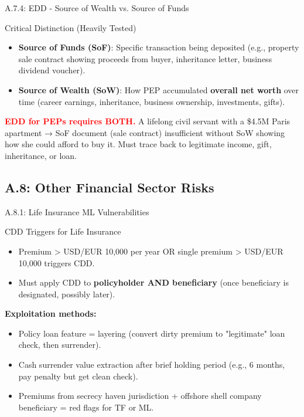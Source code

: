 \documentclass{beamer}
\begin{document}
	\begin{frame}{A.7.4: EDD - Source of Wealth vs. Source of Funds}
		\begin{block}{Critical Distinction (Heavily Tested)}
			\begin{itemize}
				\item \textbf{Source of Funds (SoF)}: Specific transaction being deposited (e.g., property sale contract showing proceeds from buyer, inheritance letter, business dividend voucher).
				\item \textbf{Source of Wealth (SoW)}: How PEP accumulated \textbf{overall net worth} over time (career earnings, inheritance, business ownership, investments, gifts).
			\end{itemize}
		\end{block}
		\textcolor{red}{\textbf{ EDD for PEPs requires BOTH.}} A lifelong civil servant with a \$4.5M Paris apartment → SoF document (sale contract) insufficient without SoW showing how she could afford to buy it. Must trace back to legitimate income, gift, inheritance, or loan.
	\end{frame}
	
	\subsection{A.8: Other Financial Sector Risks}
	
	\begin{frame}{A.8.1: Life Insurance ML Vulnerabilities}
		\begin{block}{CDD Triggers for Life Insurance}
			\begin{itemize}
				\item Premium > USD/EUR 10,000 per year OR single premium > USD/EUR 10,000 triggers CDD.
				\item Must apply CDD to \textbf{policyholder AND beneficiary} (once beneficiary is designated, possibly later).
			\end{itemize}
		\end{block}
		\textbf{Exploitation methods:}
		\begin{itemize}
			\item Policy loan feature = layering (convert dirty premium to "legitimate" loan check, then surrender).
			\item Cash surrender value extraction after brief holding period (e.g., 6 months, pay penalty but get clean check).
			\item Premiums from secrecy haven jurisdiction + offshore shell company beneficiary = red flags for TF or ML.
		\end{itemize}
	\end{frame}
	
\end{document}
